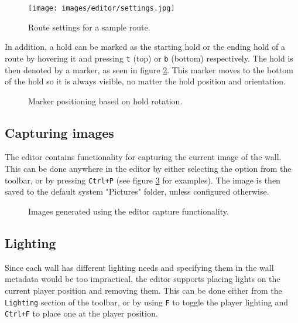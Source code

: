 \begin{figure}[t]
	\centering
	\texttt{[image: images/editor/settings.jpg]}
	\caption{Route settings for a sample route.}%
	\label{fig:routesettings}
\end{figure}

In addition, a hold can be marked as the starting hold or the ending hold of a route by hovering it and pressing \verb|t| (top) or \verb|b| (bottom) respectively.
The hold is then denoted by a marker, as seen in figure \ref{ref:topbotmarkers}.
This marker moves to the bottom of the hold so it is always visible, no matter the hold position and orientation.

\begin{figure}[h]
	\centering
	\hfill
	\hfill
	\hfill
	\caption{Marker positioning based on hold rotation.}%
	\label{ref:topbotmarkers}
\end{figure}

\subsection{Capturing images}
The editor contains functionality for capturing the current image of the wall.
This can be done anywhere in the editor by either selecting the option from the toolbar, or by pressing \verb|Ctrl+P| (see figure \ref{fig:capture} for examples).
The image is then saved to the default system "Pictures" folder, unless configured otherwise.

\begin{figure}[h]
	\centering
	\hfill
	\caption{Images generated using the editor capture functionality.}%
	\label{fig:capture}
\end{figure}

\subsection{Lighting}
Since each wall has different lighting needs and specifying them in the wall metadata would be too impractical, the editor supports placing lights on the current player position and removing them.
This can be done either from the \verb|Lighting| section of the toolbar, or by using \verb|F| to toggle the player lighting and \verb|Ctrl+F| to place one at the player position.

